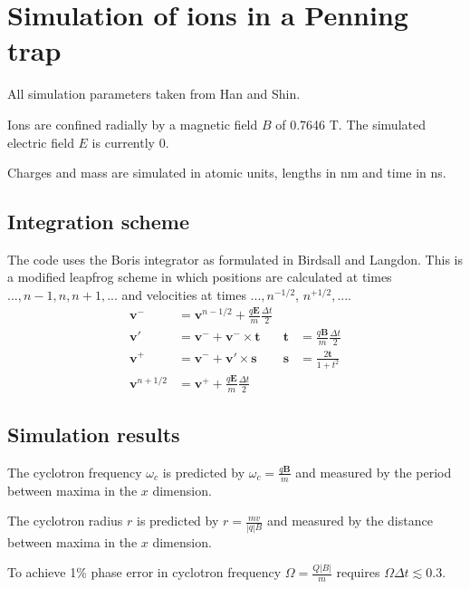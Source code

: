 \documentclass[10pt,conference,onecolumn]{IEEEtran}
\begin{document}
\section{Simulation of ions in a Penning trap}

All simulation parameters taken from Han and Shin\cite{Han1997}.

Ions are confined radially by a magnetic field $B$ of 0.7646 T.
The simulated electric field $E$ is currently 0.

Charges and mass are simulated in atomic units, lengths in nm and time in ns.



\subsection{Integration scheme}
The code uses the Boris integrator\cite{Boris1970} as formulated in Birdsall and Langdon\cite{Birdsall1985}.
This is a modified leapfrog scheme in which positions are calculated at times $..., n-1, n, n+1, ...$ and velocities at times $..., n^{-1/2}$, $n^{+1/2}, ...$.
\begin{align}
\mathbf{v}^- &= \mathbf{v}^{n-1/2} + \frac{q \mathbf{E}}{m} \frac{\Delta t}{2} \\
\mathbf{v}'  &= \mathbf{v}^- + \mathbf{v}^- \times \mathbf{t} & \mathbf{t}   &= \frac{q\mathbf{B}}{m} \frac{\Delta t}{2} \\
\mathbf{v}^+ &= \mathbf{v}^- + \mathbf{v}' \times \mathbf{s} & \mathbf{s}   &= \frac{2\mathbf{t}}{1 + t^2} \\
\mathbf{v}^{n+1/2} &= \mathbf{v}^+ + \frac{q \mathbf{E}}{m} \frac{\Delta t}{2}
\end{align}


\subsection{Simulation results}

The cyclotron frequency $\omega_c$ is predicted by $\omega_c = \frac{q\mathbf{B}}{m}$\cite{Guan1995} and measured by the period between maxima in the $x$ dimension.

The cyclotron radius $r$ is predicted by $r = \frac{m v}{|q| B}$ and measured by the distance between maxima in the $x$ dimension.

To achieve 1\% phase error in cyclotron frequency $\Omega = \frac{Q|B|}{m}$  requires $\Omega \Delta t \lesssim 0.3$\cite{Birdsall1985,Patacchini2009}.
\end{document}
